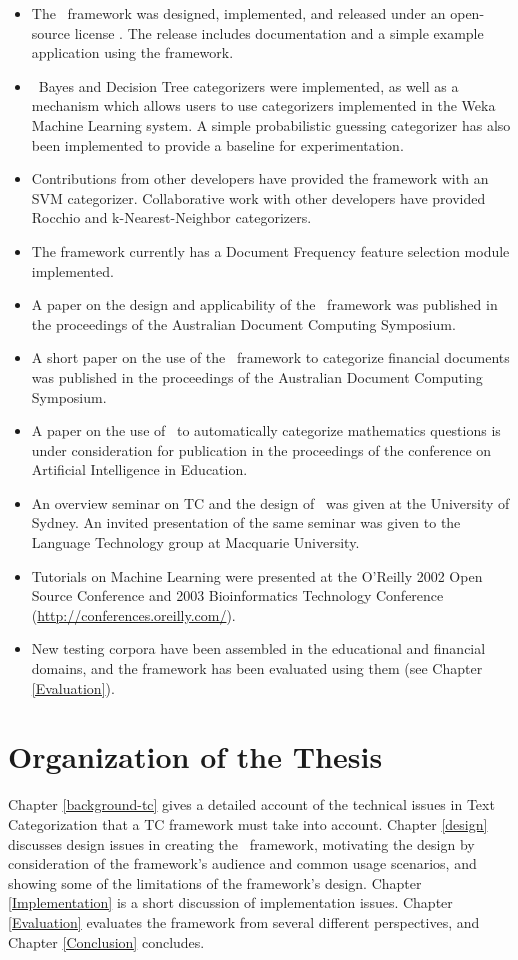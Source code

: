 \begin{itemize}
\item The \aicat\ framework was designed, implemented, and released
  under an open-source license \cite{cpan}.  The release includes
  documentation and a simple example application using the framework.
\item \naive\ Bayes and Decision Tree categorizers were implemented,
  as well as a mechanism which allows users to use categorizers
  implemented in the Weka Machine Learning system\cite{weka:99}.  A
  simple probabilistic guessing categorizer has also been implemented
  to provide a baseline for experimentation.
\item Contributions from other developers have provided the framework
  with an SVM categorizer.  Collaborative work with other developers
  have provided Rocchio and k-Nearest-Neighbor categorizers.
\item The framework currently has a Document Frequency feature
  selection module implemented.
\item A paper on the design and applicability of the \aicat\ framework
  was published in the proceedings of the Australian Document
  Computing Symposium. \cite{williams:02}
\item A short paper on the use of the \aicat\ framework to categorize
  financial documents was published in the proceedings of the
  Australian Document Computing Symposium. \cite{calvo:02}
\item A paper on the use of \aicat\ to automatically categorize
  mathematics questions is under consideration for publication in the
  proceedings of the conference on Artificial Intelligence in
  Education.  \cite{williams:03}
\item An overview seminar on TC and the design of \aicat\ was given at
  the University of Sydney.  An invited presentation of the same
  seminar was given to the Language Technology group at Macquarie
  University.
\item Tutorials on Machine Learning were presented at the O'Reilly
  2002 Open Source Conference and 2003 Bioinformatics Technology
  Conference (\url{http://conferences.oreilly.com/}).
\item New testing corpora have been assembled in the educational and
  financial domains, and the framework has been evaluated using them
  (see Chapter \ref{Evaluation}).
\end{itemize}


\section{Organization of the Thesis}

Chapter \ref{background-tc} gives a detailed account of the technical
issues in Text Categorization that a TC framework must take into
account.  Chapter \ref{design} discusses design issues in creating the
\aicat\ framework, motivating the design by consideration of the
framework's audience and common usage scenarios, and showing some of
the limitations of the framework's design.  Chapter
\ref{Implementation} is a short discussion of implementation issues.
Chapter \ref{Evaluation} evaluates the framework from several
different perspectives, and Chapter \ref{Conclusion} concludes.
